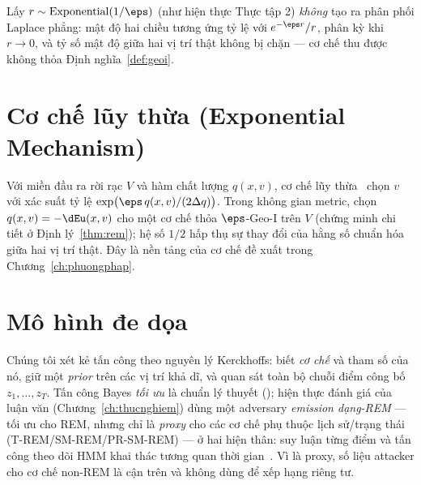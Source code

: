 \begin{nhanxet}
\label{rmk:expbug}
Lấy $r \sim \mathrm{Exponential}(1/\eps)$ (như hiện thực Thực tập 2) \emph{không}
tạo ra phân phối Laplace phẳng: mật độ hai chiều tương ứng tỷ lệ với
$e^{-\eps r}/r$, phân kỳ khi $r \to 0$, và tỷ số mật độ giữa hai vị trí thật
không bị chặn --- cơ chế thu được không thỏa Định nghĩa~\ref{def:geoi}.
\end{nhanxet}

\section{Cơ chế lũy thừa (Exponential Mechanism)}
\label{sec:em}

Với miền đầu ra rời rạc $V$ và hàm chất lượng $q(x, v)$, cơ chế lũy
thừa~\cite{mcsherry2007mechanism} chọn $v$ với xác suất tỷ lệ
$\exp\!\big(\eps\, q(x,v) / (2\Delta q)\big)$. Trong không gian metric, chọn
$q(x,v) = -\dEu(x,v)$ cho một cơ chế thỏa $\eps$-Geo-I trên $V$ (chứng minh chi
tiết ở Định lý~\ref{thm:rem}); hệ số $1/2$ hấp thụ sự thay đổi của hằng số chuẩn
hóa giữa hai vị trí thật. Đây là nền tảng của cơ chế đề xuất trong
Chương~\ref{ch:phuongphap}.

\section{Mô hình đe dọa}
\label{sec:threatmodel}

Chúng tôi xét kẻ tấn công theo nguyên lý Kerckhoffs: biết \emph{cơ chế} và tham
số của nó, giữ một \emph{prior} trên các vị trí khả dĩ, và quan sát toàn bộ chuỗi
điểm công bố $z_1, \dots, z_T$. Tấn công Bayes \emph{tối ưu} là chuẩn lý thuyết
(\cite{shokri2011quantifying}); hiện thực đánh giá của luận văn
(Chương~\ref{ch:thucnghiem}) dùng một adversary \emph{emission dạng-REM} --- tối
ưu cho REM, nhưng chỉ là \emph{proxy} cho các cơ chế phụ thuộc lịch sử/trạng thái
(T-REM/SM-REM/PR-SM-REM) --- ở hai hiện thân: suy luận từng điểm và tấn công theo
dõi HMM khai thác tương quan thời gian~\cite{xiao2015protecting}. Vì là proxy, số
liệu attacker cho cơ chế non-REM là cận trên và không dùng để xếp hạng riêng tư.
